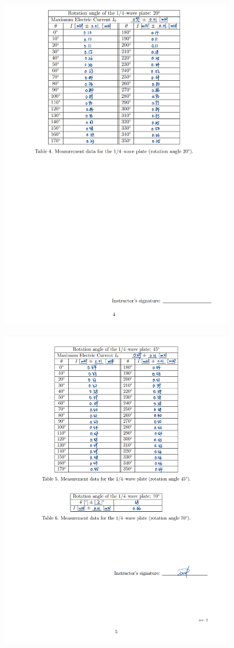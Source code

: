 \documentclass[12pt, a4paper, oneside]{article}
\begin{document}
\begin{figure}
	\centering
	\includegraphics[width=0.9\textwidth]{D4.png}
	\label{fig11}
\end{figure}

\begin{figure}
	\centering
	\includegraphics[width=0.9\textwidth]{D5.png}
	\label{fig12}
\end{figure}


\end{document}
